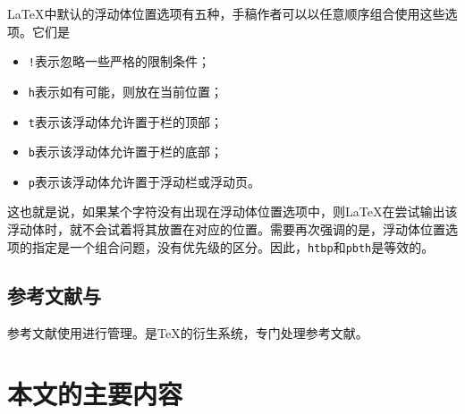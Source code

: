 \LaTeX{}中默认的浮动体位置选项有五种，手稿作者可以以任意顺序组合使用这些选项。它们是
\begin{itemize}
    \item \texttt{!}表示忽略一些严格的限制条件；
    \item \texttt{h}表示如有可能，则放在当前位置；
    \item \texttt{t}表示该浮动体允许置于栏的顶部；
    \item \texttt{b}表示该浮动体允许置于栏的底部；
    \item \texttt{p}表示该浮动体允许置于浮动栏或浮动页。
\end{itemize}

这也就是说，如果某个字符没有出现在浮动体位置选项中，则\LaTeX{}在尝试输出该浮动体时，就不会试着将其放置在对应的位置。需要再次强调的是，浮动体位置选项的指定是一个组合问题，没有优先级的区分。因此，\texttt{htbp}和\texttt{pbth}是等效的。

\subsection{参考文献与\BibTeX{}}

参考文献使用\BibTeX{}进行管理。\BibTeX{}是\TeX{}的衍生系统，专门处理参考文献。

\section{本文的主要内容}

